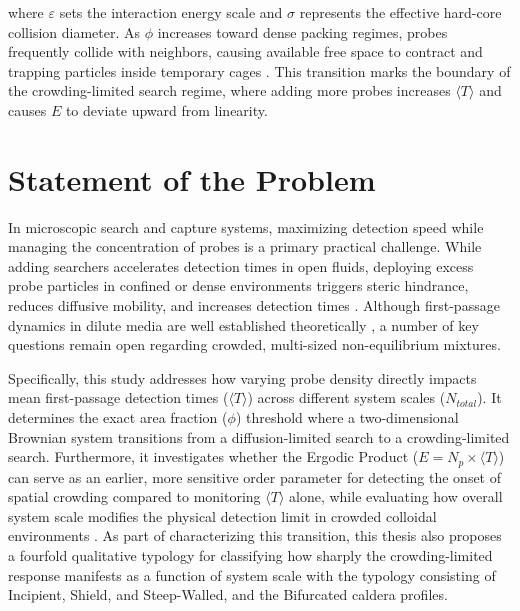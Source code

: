 \noindent where $\varepsilon$ sets the interaction energy scale and $\sigma$ represents the effective hard-core collision diameter. As $\phi$ increases toward dense packing regimes, probes frequently collide with neighbors, causing available free space to contract and trapping particles inside temporary cages \cite{Weeks2000}. This transition marks the boundary of the crowding-limited search regime, where adding more probes increases $\langle T\rangle$ and causes $E$ to deviate upward from linearity.

\section{Statement of the Problem}
\label{sec:1.3}
\hspace{\parindent} In microscopic search and capture systems, maximizing detection speed while managing the concentration of probes is a primary practical challenge. While adding searchers accelerates detection times in open fluids, deploying excess probe particles in confined or dense environments triggers steric hindrance, reduces diffusive mobility, and increases detection times \cite{Torquato2002, Weeks2000}. Although first-passage dynamics in dilute media are well established theoretically \cite{Redner2001}, a number of key questions remain open regarding crowded, multi-sized non-equilibrium mixtures.

\hspace{\parindent} Specifically, this study addresses how varying probe density directly impacts mean first-passage detection times ($\langle T\rangle$) across different system scales ($N_{total}$). It determines the exact area fraction ($\phi$) threshold where a two-dimensional Brownian system transitions from a diffusion-limited search to a crowding-limited search. Furthermore, it investigates whether the Ergodic Product ($E = N_p \times \langle T\rangle$) can serve as an earlier, more sensitive order parameter for detecting the onset of spatial crowding compared to monitoring $\langle T \rangle$ alone, while evaluating how overall system scale modifies the physical detection limit in crowded colloidal environments \cite{Balejado2026}. As part of characterizing this transition, this thesis also proposes a fourfold qualitative typology for classifying how sharply the crowding-limited response manifests as a function of system scale with the typology consisting of Incipient, Shield, and Steep-Walled, and the Bifurcated caldera profiles.


